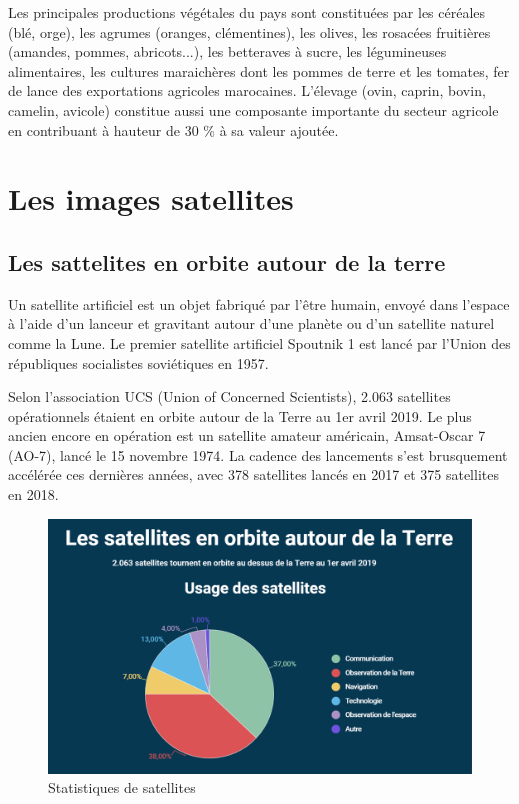 \documentclass[12pt, openany]{report}
\begin{document}
Les principales productions végétales du pays sont constituées par les céréales (blé, orge), les agrumes (oranges, clémentines), les olives, les rosacées fruitières (amandes, pommes, abricots...), les betteraves à sucre, les légumineuses alimentaires, les cultures maraichères dont les pommes de terre et les tomates, fer de lance des exportations agricoles marocaines. L'élevage (ovin, caprin, bovin, camelin, avicole) constitue aussi une composante importante du secteur agricole en contribuant à hauteur de 30 \% à sa valeur ajoutée.\cite{agr}

\section{Les images satellites}

\subsection{Les sattelites en orbite autour de la terre}

Un satellite artificiel est un objet fabriqué par l'être humain, envoyé dans l'espace à l'aide d'un lanceur et gravitant autour d'une planète ou d'un satellite naturel comme la Lune.  
Le premier satellite artificiel Spoutnik 1 est lancé par l’Union des républiques socialistes soviétiques en 1957.
\par
Selon l'association UCS (Union of Concerned Scientists), 2.063 satellites opérationnels étaient en orbite autour de la Terre au 1er avril 2019. Le plus ancien encore en opération est un satellite amateur américain, Amsat-Oscar 7 (AO-7), lancé le 15 novembre 1974. La cadence des lancements s'est brusquement accélérée ces dernières années, avec 378 satellites lancés en 2017 et 375 satellites en 2018.\cite{orbite}

\begin{figure}[H]
\centering
\includegraphics[scale=0.5]{satellite.png}
\caption{Statistiques de satellites}
\end{figure}
\end{document}
